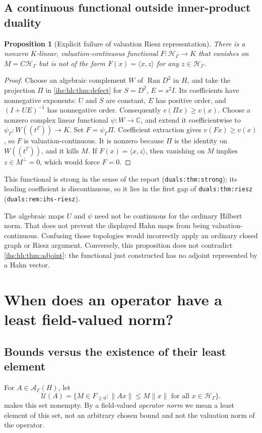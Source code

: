 \documentclass[11pt,a4paper]{article}
\numberwithin{equation}{section}
\newtheorem{proposition}[proposition]{Proposition}
\theoremstyle{definition}
\theoremstyle{remark}
\newcommand{\C}{\mathbb C}
\newcommand{\K}{K}
\newcommand{\Fld}{F}
\newcommand{\Hil}{\mathcal H_\Gamma}
\newcommand{\Ahh}{\mathcal A_\Gamma(H)}
\newcommand{\Ran}{\operatorname{Ran}}
\newcommand{\norm}[1]{\lVert#1\rVert}
\newcommand{\ip}[2]{\langle#1,#2\rangle}
\begin{document}
\subsection{A continuous functional outside inner-product duality}\label{ihs:hh:sec:riesz}
\begin{proposition}[Explicit failure of valuation Riesz representation]\label{ihs:hh:prop:riesz}
There is a nonzero $\K$-linear, valuation-continuous functional
$F:\Hil\to\K$ that vanishes on $M=C\Hil$ but is not of the form
$F(x)=\ip{x}{z}$ for any $z\in\Hil$.
\end{proposition}
\begin{proof}
Choose an algebraic complement $W$ of $\Ran D^2$ in $H$, and take the
projection $\Pi$ in \cref{ihs:hh:thm:defect} for $S=D^2$, $E=s^2I$. Its
coefficients have nonnegative exponents: $U$ and $S$ are constant, $E$ has
positive order, and $(I+UE)^{-1}$ has nonnegative order. Consequently
$v(\Pi x)\ge v(x)$. Choose a nonzero complex linear functional
$\psi:W\to\C$, and extend it coefficientwise to
$\psi_\Gamma:W((t^\Gamma))\to\K$. Set $F=\psi_\Gamma\Pi$. Coefficient
extraction gives $v(Fx)\ge v(x)$, so $F$ is valuation-continuous. It is
nonzero because $\Pi$ is the identity on $W((t^\Gamma))$, and it kills $M$.
If $F(x)=\ip{x}{z}$, then vanishing on $M$ implies $z\in M^\perp=0$, which
would force $F=0$.
\end{proof}

This functional is strong in the sense of the report
(\texttt{duals:thm:strong}); its leading coefficient is discontinuous, so it
lies in the first gap of \texttt{duals:thm:riesz}
(\texttt{duals:rem:ihs-riesz}).

The algebraic maps $U$ and $\psi$ need not be continuous for the ordinary
Hilbert norm. That does not prevent the displayed Hahn maps from being
valuation-continuous. Confusing those topologies would incorrectly apply an
ordinary closed graph or Riesz argument. Conversely, this proposition does
not contradict \cref{ihs:hh:thm:adjoint}: the functional just constructed
has no adjoint represented by a Hahn vector.

\section{When does an operator have a least field-valued norm?}\label{ihs:hh:sec:norm}

\subsection{Bounds versus the existence of their least element}\label{ihs:hh:sec:bounds}
For $A\in\Ahh$, let
\[
 \mathcal U(A)=\{M\in\Fld_{\ge0}:
             \norm{Ax}\le M\norm{x}\text{ for all }x\in\Hil\}.
\]
 makes this set nonempty. By a field-valued
\emph{operator norm} we mean a least element of this set, not an arbitrary
chosen bound and not the valuation norm of the operator.
\end{document}
